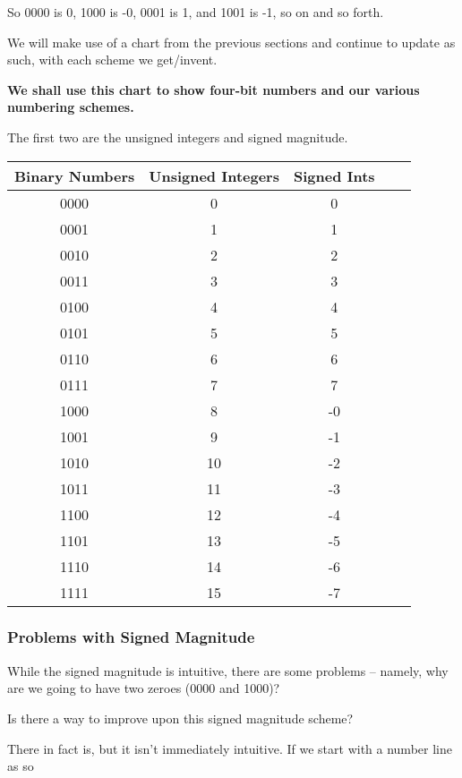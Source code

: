 \documentclass[12pt]{article}
\begin{document}
  So 0000 is 0, 1000 is -0, 0001 is 1, and 1001 is -1, so on and so forth.

  We will make use of a chart from the previous sections and continue to update as such, with
  each scheme we get/invent.

  \textbf{We shall use this chart to show four-bit numbers and our various numbering schemes.}

  The first two are the unsigned integers and signed magnitude. 
    \begin{center}
        \begin{tabular}{|c|c|c|c|c|}
          \hline
          Binary Numbers & Unsigned Integers & Signed Ints \\
          \hline
          0000 & 0 & 0\\ 
          0001 & 1 & 1\\  
          0010 & 2 & 2\\  
          0011 & 3 & 3\\  
          0100 & 4 & 4\\  
          0101 & 5 & 5\\  
          0110 & 6 & 6\\         
          0111 & 7 & 7\\  
          1000 & 8 & -0\\  
          1001 & 9 & -1\\  
          1010 & 10 & -2\\
          1011 & 11 & -3\\
          1100 & 12 & -4\\
          1101 & 13 & -5\\
          1110 & 14 & -6\\
          1111 & 15 & -7\\
          \hline
        \end{tabular}
    \end{center}

    \subsubsection{Problems with Signed Magnitude}

    While the signed magnitude is intuitive, there are some problems -- namely,
    why are we going to have two zeroes (0000 and 1000)?

    Is there a way to improve upon this signed magnitude scheme?

    There in fact is, but it isn't immediately intuitive. If we start with a
    number line as so
\end{document}
